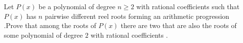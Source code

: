 Let $P(x)$ be a polynomial of degree  $n\geq 2$ with rational coefficients such that $P(x) $ has $ n$ pairwise different reel roots forming an arithmetic progression .Prove that among the roots of $P(x) $ there are two that are also the roots of some polynomial of degree $2$ with rational  coefficients .